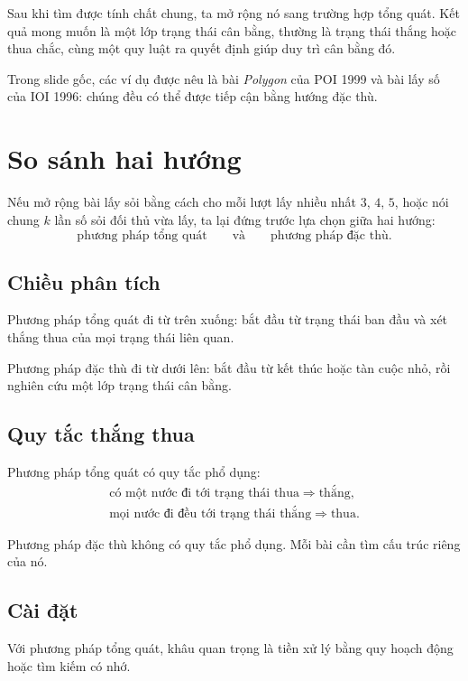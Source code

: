 \documentclass[11pt]{article}
\begin{document}
Sau khi tìm được tính chất chung, ta mở rộng nó sang trường hợp tổng quát.
Kết quả mong muốn là một lớp trạng thái cân bằng, thường là trạng thái thắng
hoặc thua chắc, cùng một quy luật ra quyết định giúp duy trì cân bằng đó.

Trong slide gốc, các ví dụ được nêu là bài \textit{Polygon} của POI 1999 và
bài lấy số của IOI 1996: chúng đều có thể được tiếp cận bằng hướng đặc thù.

\section{So sánh hai hướng}

Nếu mở rộng bài lấy sỏi bằng cách cho mỗi lượt lấy nhiều nhất \(3\), \(4\),
\(5\), hoặc nói chung \(k\) lần số sỏi đối thủ vừa lấy, ta lại đứng trước lựa
chọn giữa hai hướng:
\[
  \text{phương pháp tổng quát}
  \qquad\text{và}\qquad
  \text{phương pháp đặc thù}.
\]

\subsection{Chiều phân tích}

Phương pháp tổng quát đi từ trên xuống: bắt đầu từ trạng thái ban đầu và xét
thắng thua của mọi trạng thái liên quan.

Phương pháp đặc thù đi từ dưới lên: bắt đầu từ kết thúc hoặc tàn cuộc nhỏ,
rồi nghiên cứu một lớp trạng thái cân bằng.

\subsection{Quy tắc thắng thua}

Phương pháp tổng quát có quy tắc phổ dụng:
\[
\begin{array}{l}
\text{có một nước đi tới trạng thái thua}\Rightarrow \text{thắng},\\
\text{mọi nước đi đều tới trạng thái thắng}\Rightarrow \text{thua}.
\end{array}
\]

Phương pháp đặc thù không có quy tắc phổ dụng. Mỗi bài cần tìm cấu trúc riêng
của nó.

\subsection{Cài đặt}

Với phương pháp tổng quát, khâu quan trọng là tiền xử lý bằng quy hoạch động
hoặc tìm kiếm có nhớ.
\end{document}
